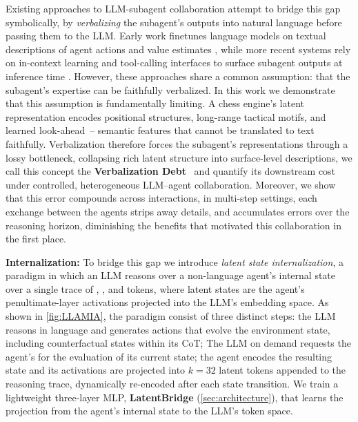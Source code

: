 Existing approaches to LLM-subagent collaboration attempt to bridge this gap symbolically, by \emph{verbalizing} the subagent's outputs into natural language before passing them to the LLM.
Early work finetunes language models on textual descriptions of agent actions and value estimates \citep{zang2019automated, lee2022improving}, while more recent systems rely on in-context learning and tool-calling interfaces to surface subagent outputs at inference time \citep{schick2023toolformerlanguagemodelsteach, yao2022react, kim2024bridging}.
However, these approaches share a common assumption: that the subagent's expertise can be faithfully verbalized.
In this work we demonstrate that this assumption is fundamentally limiting.
A chess engine's latent representation encodes positional structures, long-range tactical motifs, and learned look-ahead~\citep{jenner2024evidence}-- semantic features that cannot be translated to text faithfully.
Verbalization therefore forces the subagent's representations through a lossy bottleneck, collapsing rich latent structure into surface-level descriptions, we call this concept the \textbf{Verbalization Debt}~\cite{zhu2025surveylatentreasoning} and quantify its downstream cost under controlled, heterogeneous LLM--agent collaboration. Moreover, we show that this error compounds across interactions, in multi-step settings, each exchange between the agents strips away details, and accumulates errors over the reasoning horizon, diminishing the benefits that motivated this collaboration in the first place.

\textbf{Internalization:} To bridge this gap we introduce \emph{latent state internalization}, a paradigm in which an LLM reasons over a non-language agent's internal state over a single trace of , , and  tokens, where latent states are the agent's penultimate-layer activations projected into the LLM's embedding space. As shown in \cref{fig:LLAMIA}, the paradigm consist of three distinct steps:  the LLM reasons in language and generates actions that evolve the environment state, including counterfactual states within its CoT; The LLM on demand requests the agent's for the evaluation of its current state;  the agent encodes the resulting state and its activations are projected into $k{=}32$ latent tokens appended to the reasoning trace, dynamically re-encoded after each state transition. We train a lightweight three-layer MLP, \textbf{LatentBridge} (\cref{sec:architecture}), that learns the projection from the agent's internal state to the LLM's token space.

